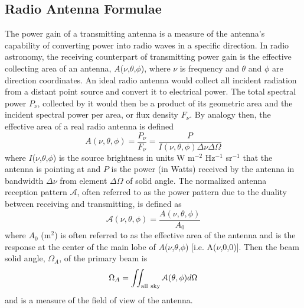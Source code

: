 \subsection{Radio Antenna Formulae}\label{subsec:1}
The power gain of a transmitting antenna is a measure of the antenna's capability of converting power into radio waves in a specific direction. In radio astronomy, the receiving counterpart of transmitting power gain is the effective collecting area of an antenna, $A$($\nu$,$\theta$,$\phi$), where $\nu$ is frequency and $\theta$ and $\phi$ are direction coordinates. An ideal radio antenna would collect all incident radiation from a distant point source and convert it to electrical power. The total spectral power $P_{\nu}$, collected by it would then be a product of its geometric area and the incident spectral power per area, or flux density $F_{\nu}$. By analogy then, the effective area of a real radio antenna is defined
\begin{equation}
A(\nu,\theta,\phi)= \frac{P_{\nu}}{F_{\nu}}=\frac{P}{I(\nu,\theta,\phi)\Delta \nu \Delta \Omega}
\end{equation}
where $I$($\nu$,$\theta$,$\phi$) is the source brightness in units W m$^{-2}$ Hz$^{-1}$ sr$^{-1}$ that the antenna is pointing at and $P$ is the power (in Watts) received by the antenna in bandwidth $\Delta \nu$ from element $\Delta\Omega$ of solid angle. The normalized antenna reception pattern $\mathcal{A}$, often referred to as the power pattern due to the duality between receiving and transmitting, is defined as 
\begin{equation}
\mathcal{A}(\nu,\theta,\phi)= \frac{A(\nu,\theta,\phi)}{A_{0}}
\end{equation}
where $A_0$ (m$^2$) is often referred to as the effective area of the antenna and is the response at the center of the main lobe of $A$($\nu$,$\theta$,$\phi$) [i.e. A($\nu$,0,0)]. Then the beam solid angle, $\Omega _{A}$, of the primary beam is 
\begin{equation}
\Omega _{A} = \int \!\!\! \int _{\rm{all\ sky}} \mathcal{A}(\theta,\phi) d \Omega
\end{equation}
and is a measure of the field of view of the antenna. 

